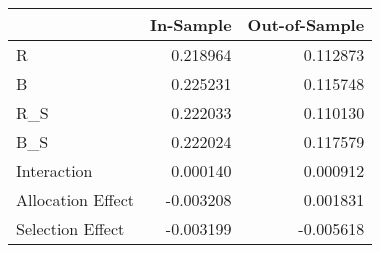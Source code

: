 \begin{tabular}{lrr}
\toprule
{} &  In-Sample &  Out-of-Sample \\
\midrule
R                 &   0.218964 &       0.112873 \\
B                 &   0.225231 &       0.115748 \\
R\_S               &   0.222033 &       0.110130 \\
B\_S               &   0.222024 &       0.117579 \\
Interaction       &   0.000140 &       0.000912 \\
Allocation Effect &  -0.003208 &       0.001831 \\
Selection Effect  &  -0.003199 &      -0.005618 \\
\bottomrule
\end{tabular}
